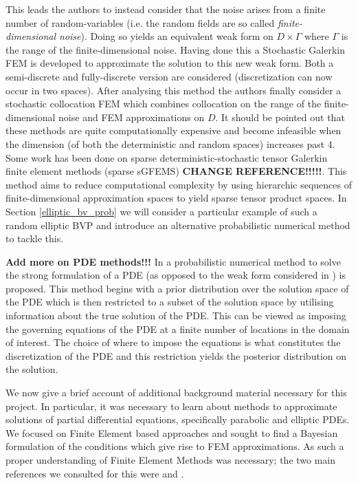 This leads the authors to instead consider that the noise arises from a finite number of random-variables (i.e. the random fields are so called \textit{finite-dimensional noise}). Doing so yields an equivalent weak form on $D\times\Gamma$ where $\Gamma$ is the range of the finite-dimensional noise. Having done this a Stochastic Galerkin FEM is developed to approximate the solution to this new weak form. Both a semi-discrete and fully-discrete version are considered (discretization can now occur in two spaces). After analysing this method the authors finally consider a stochastic collocation FEM which combines collocation on the range of the finite-dimensional noise and FEM approximations on $D$. It should be pointed out that these methods are quite computationally expensive and become infeasible when the dimension (of both the deterministic and random spaces) increases past 4. Some work has been done on sparse deterministic-stochastic tensor Galerkin finite element methods (sparse sGFEMS) \textcolor{blue}{\cite{bieri2010sparse}} \textbf{CHANGE REFERENCE!!!!!}. This method aims to reduce computational complexity by using hierarchic sequences of finite-dimensional approximation spaces to yield sparse tensor product spaces. In Section \textcolor{blue}{\ref{elliptic_bv_prob}} we will consider a particular example of such a random elliptic BVP and introduce an alternative probabilistic numerical method to tackle this.

\textbf{Add more on PDE methods!!!} In \textcolor{blue}{\cite{cockayne2016probabilistic}} a probabilistic numerical method to solve the strong formulation of a PDE (as opposed to the weak form considered in \textcolor{blue}{\cite{conrad2017statistical}}) is proposed. This method begins with a prior distribution over the solution space of the PDE which is then restricted to a subset of the solution space by utilising information about the true solution of the PDE. This can be viewed as imposing the governing equations of the PDE at a finite number of locations in the domain of interest. The choice of where to impose the equations is what constitutes the discretization of the PDE and this restriction yields the posterior distribution on the solution.

We now give a brief account of additional background material necessary for this project. In particular, it was necessary to learn about methods to approximate solutions of partial differential equations, specifically parabolic and elliptic PDEs. We focused on Finite Element based approaches and sought to find a Bayesian formulation of the conditions which give rise to FEM approximations. As such a proper understanding of Finite Element Methods was necessary; the two main references we consulted for this were \textcolor{blue}{\cite{lord2014introduction}} and \textcolor{blue}{\cite{larsson2008partial}}.

